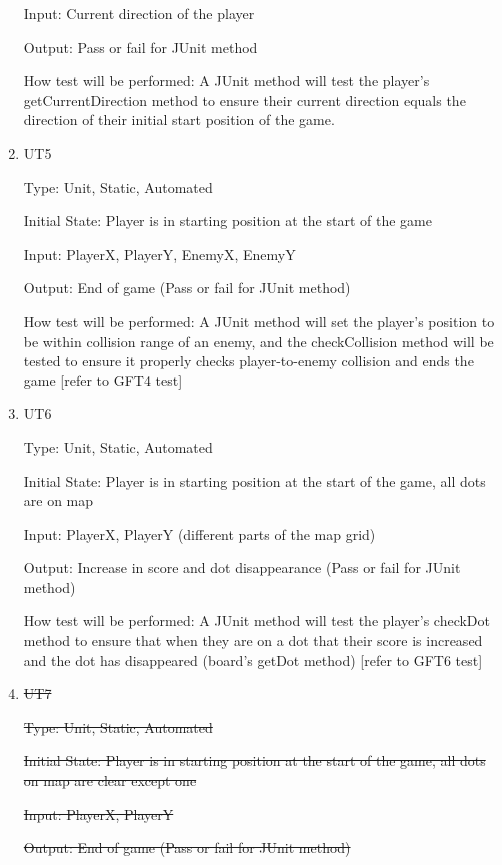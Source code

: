 \documentclass[12pt, titlepage]{article}
\begin{document}
\begin{enumerate}
Input: Current direction of the player
					
Output: Pass or fail for JUnit method
					
How test will be performed: A JUnit method will test the player's getCurrentDirection method to ensure their current direction equals the direction of their initial start position of the game.

\item{UT5\\}

Type: Unit, Static, Automated
					
Initial State: Player is in starting position at the start of the game
					
Input: PlayerX, PlayerY, EnemyX, EnemyY
					
Output: End of game (Pass or fail for JUnit method)
					
How test will be performed: A JUnit method will set the player's position to be within collision range of an enemy, and the checkCollision method will be tested to ensure it properly checks player-to-enemy collision and ends the game [refer to GFT4 test]

\item{UT6\\}

Type: Unit, Static, Automated
					
Initial State: Player is in starting position at the start of the game, all dots are on map
					
Input: PlayerX, PlayerY (different parts of the map grid)
					
Output: Increase in score and dot disappearance (Pass or fail for JUnit method)
					
How test will be performed: A JUnit method will test the player's checkDot method to ensure that when they are on a dot that their score is increased and the dot has disappeared (board's getDot method) [refer to GFT6 test]

\item{\sout{UT7}\\}

\sout{Type: Unit, Static, Automated}

\sout{Initial State: Player is in starting position at the start of the game, all dots on map are clear except one}

\sout{Input: PlayerX, PlayerY}
					
\sout{Output: End of game (Pass or fail for JUnit method)}
					

\end{enumerate}
\end{document}

